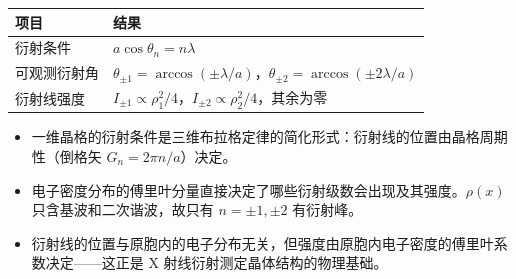 \begin{formulabox}[答案汇总]
\begin{center}
\begin{tabular}{ll}
\toprule
\textbf{项目} & \textbf{结果} \\
\midrule
衍射条件 & $a\cos\theta_n=n\lambda$ \\
可观测衍射角 & $\theta_{\pm1}=\arccos(\pm\lambda/a)$，$\theta_{\pm2}=\arccos(\pm2\lambda/a)$ \\
衍射线强度 & $I_{\pm1}\propto\rho_1^2/4$，$I_{\pm2}\propto\rho_2^2/4$，其余为零 \\
\bottomrule
\end{tabular}
\end{center}
\end{formulabox}

\begin{insightbox}[物理图像]
\begin{itemize}
    \item 一维晶格的衍射条件是三维布拉格定律的简化形式：衍射线的位置由晶格周期性（倒格矢 $G_n=2\pi n/a$）决定。
    \item 电子密度分布的傅里叶分量直接决定了哪些衍射级数会出现及其强度。$\rho(x)$ 只含基波和二次谐波，故只有 $n=\pm1,\pm2$ 有衍射峰。
    \item 衍射线的位置与原胞内的电子分布无关，但强度由原胞内电子密度的傅里叶系数决定——这正是 X 射线衍射测定晶体结构的物理基础。
\end{itemize}
\end{insightbox}
